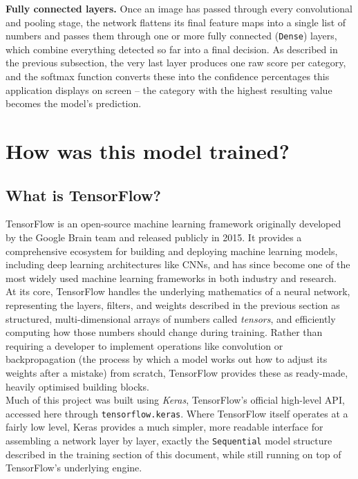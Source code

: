 \documentclass[11 pt , a 4 paper ]{article}
\theoremstyle{definition}
\begin{document}
\noindent\textbf{Fully connected layers.} Once an image has passed through every convolutional and pooling stage, the network flattens its final feature maps into a single list of numbers and passes them through one or more fully connected (\texttt{Dense}) layers, which combine everything detected so far into a final decision. As described in the previous subsection, the very last layer produces one raw score per category, and the softmax function converts these into the confidence percentages this application displays on screen -- the category with the highest resulting value becomes the model's prediction.
 
\section{How was this model trained?}
 
\subsection{What is TensorFlow?}
 
TensorFlow is an open-source machine learning framework originally developed by the Google Brain team and released publicly in 2015. It provides a comprehensive ecosystem for building and deploying machine learning models, including deep learning architectures like CNNs, and has since become one of the most widely used machine learning frameworks in both industry and research.\\
 
\noindent At its core, TensorFlow handles the underlying mathematics of a neural network, representing the layers, filters, and weights described in the previous section as structured, multi-dimensional arrays of numbers called \emph{tensors}, and efficiently computing how those numbers should change during training. Rather than requiring a developer to implement operations like convolution or backpropagation (the process by which a model works out how to adjust its weights after a mistake) from scratch, TensorFlow provides these as ready-made, heavily optimised building blocks.\\
 
\noindent Much of this project was built using \emph{Keras}, TensorFlow's official high-level API, accessed here through \texttt{tensorflow.keras}. Where TensorFlow itself operates at a fairly low level, Keras provides a much simpler, more readable interface for assembling a network layer by layer, exactly the \texttt{Sequential} model structure described in the training section of this document, while still running on top of TensorFlow's underlying engine.\\
 
\end{document}
